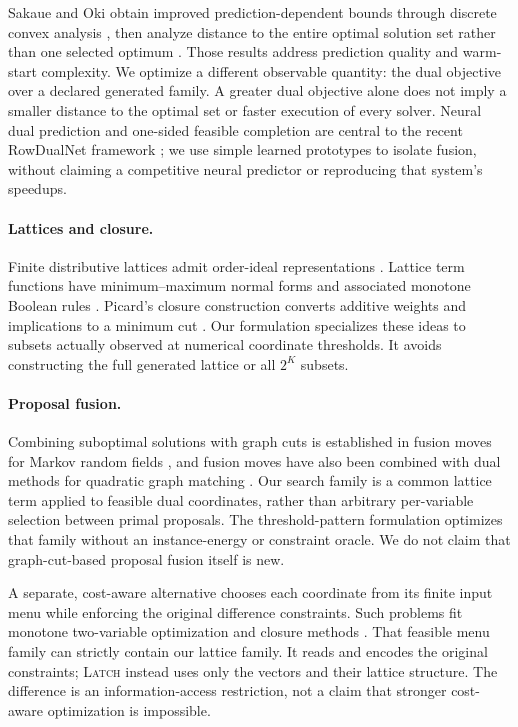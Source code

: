 \documentclass[10pt,letterpaper]{article}
\newcommand{\LATCH}{\textsc{Latch}}
\begin{document}
Sakaue and Oki obtain improved prediction-dependent bounds through discrete convex analysis \citep{sakaue22}, then analyze distance to the entire optimal solution set rather than one selected optimum \citep{sakaue23}. Those results address prediction quality and warm-start complexity. We optimize a different observable quantity: the dual objective over a declared generated family. A greater dual objective alone does not imply a smaller distance to the optimal set or faster execution of every solver. Neural dual prediction and one-sided feasible completion are central to the recent RowDualNet framework \citep{rowdual}; we use simple learned prototypes to isolate fusion, without claiming a competitive neural predictor or reproducing that system's speedups.

\paragraph{Lattices and closure.}
Finite distributive lattices admit order-ideal representations \citep{birkhoff}. Lattice term functions have minimum--maximum normal forms and associated monotone Boolean rules \citep{couceiro}. Picard's closure construction converts additive weights and implications to a minimum cut \citep{picard}. Our formulation specializes these ideas to subsets actually observed at numerical coordinate thresholds. It avoids constructing the full generated lattice or all $2^K$ subsets.

\paragraph{Proposal fusion.}
Combining suboptimal solutions with graph cuts is established in fusion moves for Markov random fields \citep{lempitsky}, and fusion moves have also been combined with dual methods for quadratic graph matching \citep{graphfusion}. Our search family is a common lattice term applied to feasible dual coordinates, rather than arbitrary per-variable selection between primal proposals. The threshold-pattern formulation optimizes that family without an instance-energy or constraint oracle. We do not claim that graph-cut-based proposal fusion itself is new.

A separate, cost-aware alternative chooses each coordinate from its finite input menu while enforcing the original difference constraints. Such problems fit monotone two-variable optimization and closure methods \citep{hochbaum}. That feasible menu family can strictly contain our lattice family. It reads and encodes the original constraints; \LATCH{} instead uses only the vectors and their lattice structure. The difference is an information-access restriction, not a claim that stronger cost-aware optimization is impossible.
\end{document}
